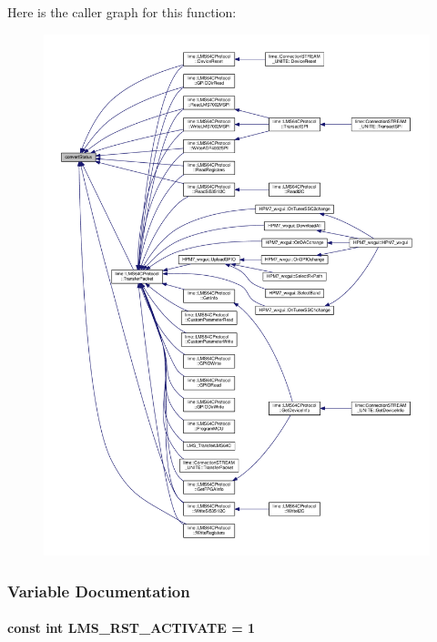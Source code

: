Here is the caller graph for this function\+:
\nopagebreak
\begin{figure}[H]
\begin{center}
\leavevmode
\includegraphics[width=350pt]{d2/d65/LMS64CProtocol_8cpp_af62b1cc795d9086a8ad8d7164b0cad8b_icgraph}
\end{center}
\end{figure}




\subsubsection{Variable Documentation}
\paragraph[{L\+M\+S\+\_\+\+R\+S\+T\+\_\+\+A\+C\+T\+I\+V\+A\+TE}]{\setlength{\rightskip}{0pt plus 5cm}const {\bf int} L\+M\+S\+\_\+\+R\+S\+T\+\_\+\+A\+C\+T\+I\+V\+A\+TE = 1}\label{LMS64CProtocol_8cpp_ac916c3ad4a8d88d16a5556f690a436e5}


